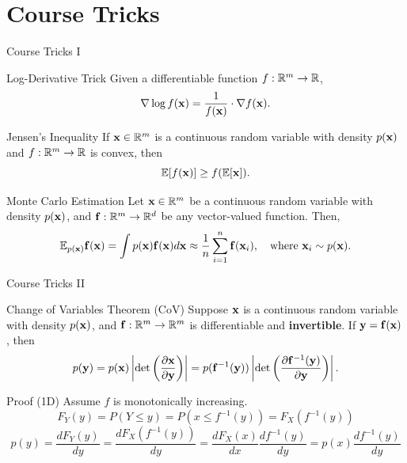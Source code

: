 \documentclass{beamer}
\begin{document}
\section{Course Tricks}
\begin{frame}{Course Tricks I}
	\begin{block}{Log-Derivative Trick}
		Given a differentiable function $f: \mathbb{R}^m \to \mathbb{R}$,
		$$
			\nabla \log f(\mathbf{x}) = \frac{1}{f(\mathbf{x})} \cdot \nabla f(\mathbf{x}).
		$$
		\vspace{-0.5cm}
	\end{block}
	\begin{block}{Jensen's Inequality}
		If $\mathbf{x} \in \mathbb{R}^m$ is a continuous random variable with density $p(\mathbf{x})$ and $f: \mathbb{R}^m \to \mathbb{R}$ is convex, then
		$$
			\mathbb{E}[f(\mathbf{x})] \geq f(\mathbb{E}[\mathbf{x}]).
		$$
		\vspace{-0.7cm}
	\end{block}
	\begin{block}{Monte Carlo Estimation}
		Let $\mathbf{x} \in \mathbb{R}^m$ be a continuous random variable with density $p(\mathbf{x})$, and $\mathbf{f}: \mathbb{R}^m \to \mathbb{R}^d$ be any vector-valued function. Then,
		$$
			\mathbb{E}_{p(\mathbf{x})} \mathbf{f}(\mathbf{x}) = \int p(\mathbf{x}) \mathbf{f}(\mathbf{x}) d \mathbf{x} \approx \frac{1}{n} \sum_{i=1}^n \mathbf{f}(\mathbf{x}_i), \quad 
			\text{where } \mathbf{x}_i \sim p(\mathbf{x}).
		$$
		\vspace{-0.4cm}
	\end{block}
\end{frame}
\begin{frame}{Course Tricks II}
	\begin{block}{Change of Variables Theorem (CoV)}
		Suppose $\mathbf{x}$ is a continuous random variable with density $p(\mathbf{x})$, and $\mathbf{f}: \mathbb{R}^m \to \mathbb{R}^m$ is differentiable and \textbf{invertible}. If $\mathbf{y} = \mathbf{f}(\mathbf{x})$, then
		$$
			p(\mathbf{y}) = p(\mathbf{x}) \left|\det \left(  \frac{\partial \mathbf{x}}{\partial \mathbf{y}} \right) \right| = p(\mathbf{f}^{-1}(\mathbf{y})) \left|\det \left(  \frac{\partial \mathbf{f}^{-1}(\mathbf{y})}{\partial \mathbf{y}} \right) \right|.
		$$
		\vspace{-0.5cm}
	\end{block}
	\begin{block}{Proof (1D)}
		Assume $f$ is monotonically increasing.
		$$
			F_Y(y) = P(Y \leq y) = P(x \leq f^{-1}(y)) = F_X(f^{-1}(y))
		$$
		$$
			p(y) = \frac{dF_Y(y)}{dy} = \frac{dF_X(f^{-1}(y))}{dy} = \frac{dF_X(x)}{dx} \frac{df^{-1}(y)}{dy} =  p(x) \frac{df^{-1}(y)}{dy}
		$$
	\end{block}
\end{frame}
\end{document}
